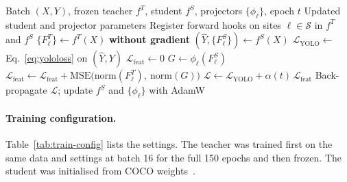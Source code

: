 \begin{algorithm}[htbp]
\caption{One training step of feature distillation}
\label{alg:kd}
\begin{algorithmic}[1]
\Require Batch $(X,Y)$, frozen teacher $f^T$, student $f^S$, projectors $\{\phi_\ell\}$, epoch $t$
\Ensure Updated student and projector parameters
\State Register forward hooks on sites $\ell\in\mathcal{S}$ in $f^T$ and $f^S$
\State $\{F^T_\ell\} \gets f^T(X)$ \textbf{without gradient} 
\State $(\hat Y, \{F^S_\ell\}) \gets f^S(X)$
\State $\mathcal{L}_{\text{YOLO}} \gets$ Eq.~\eqref{eq:yololoss} on $(\hat Y, Y)$
\State $\mathcal{L}_{\text{feat}} \gets 0$
    \State $G \gets \phi_\ell(F^S_\ell)$ 
    \State $\mathcal{L}_{\text{feat}} \gets \mathcal{L}_{\text{feat}} + \mathrm{MSE}\big(\mathrm{norm}(F^T_\ell),\ \mathrm{norm}(G)\big)$ 
\EndFor
\State $\mathcal{L} \gets \mathcal{L}_{\text{YOLO}} + \alpha(t)\,\mathcal{L}_{\text{feat}}$ 
\State Back-propagate $\mathcal{L}$; update $f^S$ and $\{\phi_\ell\}$ with AdamW
\end{algorithmic}
\end{algorithm}

\paragraph{Training configuration.} Table~\ref{tab:train-config} lists the settings. The teacher was trained first on the same data and settings at batch 16 for the full 150 epochs and then frozen. The student was initialised from COCO weights~\cite{lin2014coco}.

